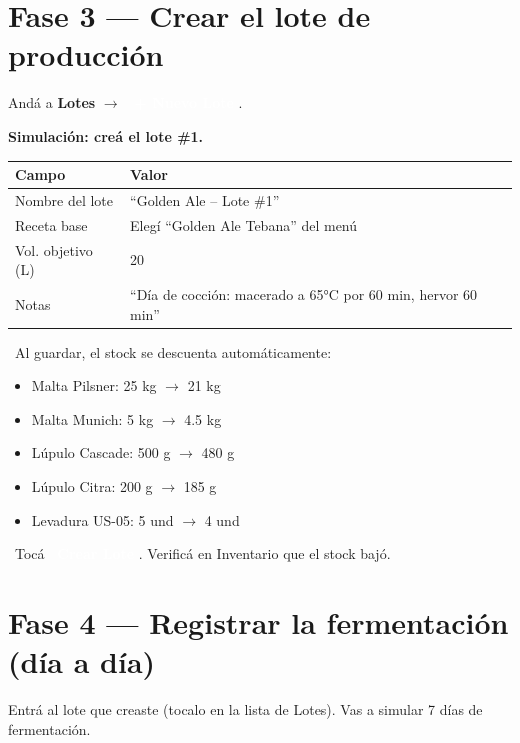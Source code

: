 \documentclass[11pt,a4paper]{report}
\newcommand{\appbtn}[1]{%
  \textcolor{white}{\colorbox{beer}{\footnotesize\sffamily\bfseries\ #1}}%
}
\begin{document}
\section{Fase 3 — Crear el lote de producción}

Andá a \textbf{Lotes} $\to$ \appbtn{+ Nuevo Lote}.

\begin{simbox}
\textbf{Simulación: creá el lote \#1.}

\begin{tabular}{ll}
\toprule
\textbf{Campo} & \textbf{Valor} \\
\midrule
Nombre del lote   & ``Golden Ale -- Lote \#1'' \\
Receta base       & Elegí ``Golden Ale Tebana'' del menú \\
Vol. objetivo (L) & 20 \\
Notas             & ``Día de cocción: macerado a 65°C por 60 min, hervor 60 min'' \\
\bottomrule
\end{tabular}

\medskip
\textcolor{accent}{\faExclamationTriangle\ Al guardar, el stock se descuenta automáticamente:}
\begin{itemize}
  \item Malta Pilsner: 25 kg $\to$ 21 kg
  \item Malta Munich: 5 kg $\to$ 4.5 kg
  \item Lúpulo Cascade: 500 g $\to$ 480 g
  \item Lúpulo Citra: 200 g $\to$ 185 g
  \item Levadura US-05: 5 und $\to$ 4 und
\end{itemize}

\medskip
\textcolor{accent}{\faArrowRight\ Tocá \appbtn{Crear Lote}. Verificá en Inventario que el stock bajó.}
\end{simbox}

\section{Fase 4 — Registrar la fermentación (día a día)}

Entrá al lote que creaste (tocalo en la lista de Lotes). Vas a simular 7 días de fermentación.
\end{document}
